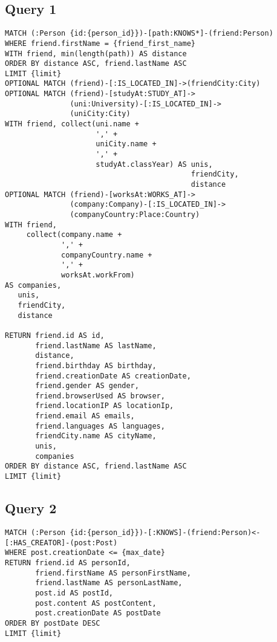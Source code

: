 \subsection{Query 1}
\begin{verbatim}
MATCH (:Person {id:{person_id}})-[path:KNOWS*]-(friend:Person)
WHERE friend.firstName = {friend_first_name}
WITH friend, min(length(path)) AS distance
ORDER BY distance ASC, friend.lastName ASC
LIMIT {limit}
OPTIONAL MATCH (friend)-[:IS_LOCATED_IN]->(friendCity:City)
OPTIONAL MATCH (friend)-[studyAt:STUDY_AT]->
               (uni:University)-[:IS_LOCATED_IN]->
               (uniCity:City)
WITH friend, collect(uni.name + 
                     ',' + 
                     uniCity.name + 
                     ',' + 
                     studyAt.classYear) AS unis, 
                                           friendCity,
                                           distance
OPTIONAL MATCH (friend)-[worksAt:WORKS_AT]->
               (company:Company)-[:IS_LOCATED_IN]->
               (companyCountry:Place:Country)
WITH friend, 
     collect(company.name + 
             ',' + 
             companyCountry.name + 
             ',' + 
             worksAt.workFrom) 
AS companies,
   unis, 
   friendCity, 
   distance

RETURN friend.id AS id, 
       friend.lastName AS lastName, 
       distance, 
       friend.birthday AS birthday, 
       friend.creationDate AS creationDate, 
       friend.gender AS gender, 
       friend.browserUsed AS browser, 
       friend.locationIP AS locationIp, 
       friend.email AS emails, 
       friend.languages AS languages, 
       friendCity.name AS cityName, 
       unis, 
       companies
ORDER BY distance ASC, friend.lastName ASC
LIMIT {limit}
\end{verbatim}

\subsection{Query 2}

\begin{verbatim}
MATCH (:Person {id:{person_id}})-[:KNOWS]-(friend:Person)<-[:HAS_CREATOR]-(post:Post)
WHERE post.creationDate <= {max_date}
RETURN friend.id AS personId, 
       friend.firstName AS personFirstName, 
       friend.lastName AS personLastName, 
       post.id AS postId, 
       post.content AS postContent, 
       post.creationDate AS postDate
ORDER BY postDate DESC
LIMIT {limit}
\end{verbatim}

